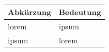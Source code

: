 


\begin{table}[h!]
    \begin{tabularx}{\textwidth}{l X}
        \toprule 
        Abkürzung & Bedeutung \\
        \midrule
        lorem & ipsum \\
        ipsum & lorem \\
        \bottomrule 
    \end{tabularx}
\end{table}
